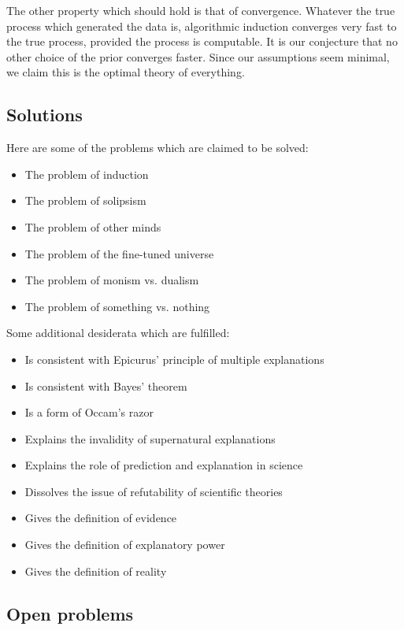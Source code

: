 The other property which should hold is that of convergence.
Whatever the true process which generated the data is, algorithmic induction converges very fast to the true process, provided the process is computable.
It is our conjecture that no other choice of the prior converges faster.
Since our assumptions seem minimal, we claim this is the optimal theory of everything.

\newpage

\subsection{Solutions}

Here are some of the problems which are claimed to be solved:

\begin{itemize}
\item The problem of induction
\item The problem of solipsism
\item The problem of other minds
\item The problem of the fine-tuned universe
\item The problem of monism vs. dualism
\item The problem of something vs. nothing
\end{itemize}

\noindent
Some additional desiderata which are fulfilled:

\begin{itemize}
\item Is consistent with Epicurus' principle of multiple explanations
\item Is consistent with Bayes' theorem
\item Is a form of Occam's razor
\item Explains the invalidity of supernatural explanations
\item Explains the role of prediction and explanation in science
\item Dissolves the issue of refutability of scientific theories
\item Gives the definition of evidence
\item Gives the definition of explanatory power
\item Gives the definition of reality
\end{itemize}

\newpage

\subsection{Open problems}

